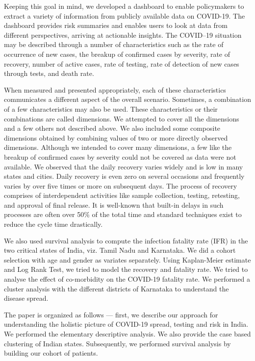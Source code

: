 \documentclass[letterpaper]{article} %
\begin{document}
	Keeping this goal in mind, we developed a dashboard to enable policymakers to extract a variety of information from publicly available data on COVID-19. The dashboard provides risk summaries and enables users to look at data from different perspectives, arriving at actionable insights. The COVID–19 situation may be described through a number of characteristics such as the rate of occurrence of new cases, the breakup of confirmed cases by severity, rate of recovery, number of active cases, rate of testing, rate of detection of new cases through tests, and death rate. 
	
	When measured and presented appropriately, each of these characteristics communicates a different aspect of the overall scenario. Sometimes, a combination of a few characteristics may also be used. These characteristics or their combinations are called dimensions. We attempted to cover all the dimensions and a few others not described above. We also included some composite dimensions obtained by combining values of two or more directly observed dimensions. Although we intended to cover many dimensions, a few like the breakup of confirmed cases by severity could not be covered as data were not available. We observed that the daily recovery varies widely and is low in many states and cities. Daily recovery is even zero on several occasions and frequently varies by over five times or more on subsequent days. The process of recovery comprises of interdependent activities like sample collection, testing, retesting, and approval of final release. It is well-known that built-in delays in such processes are often over 50\% of the total time and standard techniques exist to reduce the cycle time drastically.
	
	We also used survival analysis to compute the infection fatality rate (IFR) in the two critical states of India, viz. Tamil Nadu and Karnataka. We did a cohort selection with age and gender as variates separately. Using Kaplan-Meier estimate and Log Rank Test, we tried to model the recovery and fatality rate. We tried to analyse the effect of co-morbidity on the COVID-19 fatality rate. We performed a cluster analysis with the different districts of Karnataka to understand the disease spread.
	
	The paper is organized as follows --- first, we describe our approach for understanding the holistic picture of COVID-19 spread, testing and risk in India. We performed the elementary descriptive analysis. We also provide the case based clustering of Indian states. Subsequently, we performed survival analysis by building our cohort of patients. 
\end{document}

